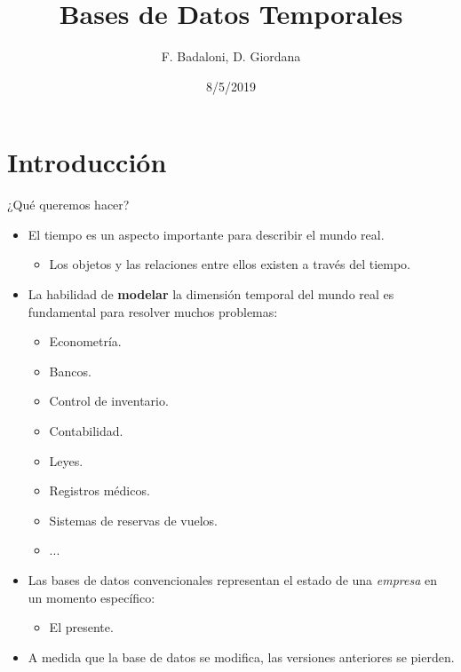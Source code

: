 \documentclass[handout, t, aspectratio=169]{beamer}
\title{Bases de Datos Temporales}
\author{F. Badaloni, D. Giordana}
\institute{FCEIA, UNR}
\date{8/5/2019}
\begin{document}
\frame{\titlepage}
\section{Introducción}
\begin{frame}{¿Qué queremos hacer?}
    \begin{itemize}
    \item El tiempo es un aspecto importante para describir el mundo real. \pause
    \begin{itemize}
        \item Los objetos y las relaciones entre ellos existen a través del tiempo.
    \end{itemize}\pause
    \item La habilidad de \textbf{modelar} la dimensión temporal del mundo real es fundamental para resolver muchos problemas:
    \begin{itemize}
        \item Econometría.\pause
        \item Bancos.\pause
        \item Control de inventario.\pause
        \item Contabilidad.\pause
        \item Leyes.\pause
        \item Registros médicos.\pause
        \item Sistemas de reservas de vuelos.\pause
        \item ...
    \end{itemize}\pause
    \item Las bases de datos convencionales representan el estado de una \textit{empresa} en un momento específico:\pause
    \begin{itemize}
        \item El presente.\pause
    \end{itemize}
    \item A medida que la base de datos se modifica, las versiones anteriores se pierden.
\end{itemize}
\end{frame}
\end{document}
